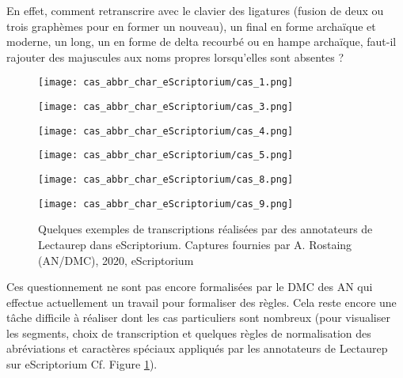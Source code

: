 En effet, comment retranscrire avec le clavier des ligatures (fusion de deux ou trois graphèmes pour en former un nouveau), un  final en forme archaïque et moderne, un  long, un  en forme de delta recourbé ou en hampe archaïque, faut-il rajouter des majuscules aux noms propres lorsqu'elles sont absentes ? 
\newpage
\begin{figure}[H]
    \begin{minipage}[c]{.46\linewidth} 
        \centering
        \texttt{[image: cas\_abbr\_char\_eScriptorium/cas\_1.png]}
        \end{minipage}
    \hfill%
    \begin{minipage}[c]{.46\linewidth}
        \centering
        \texttt{[image: cas\_abbr\_char\_eScriptorium/cas\_3.png]}
    \end{minipage}
    \hfill%
    \begin{minipage}[c]{.46\linewidth}
        \centering
        \texttt{[image: cas\_abbr\_char\_eScriptorium/cas\_4.png]}
    \end{minipage}
    \hfill%
    \begin{minipage}[c]{.46\linewidth}
        \centering
        \texttt{[image: cas\_abbr\_char\_eScriptorium/cas\_5.png]}
    \end{minipage}
    \hfill%
    \begin{minipage}[c]{.46\linewidth}
        \centering
        \texttt{[image: cas\_abbr\_char\_eScriptorium/cas\_8.png]}
    \end{minipage}
    \hfill%
    \begin{minipage}[c]{.46\linewidth}
        \centering
        \texttt{[image: cas\_abbr\_char\_eScriptorium/cas\_9.png]}
    \end{minipage}
        \caption{Quelques exemples de transcriptions réalisées par des annotateurs de Lectaurep dans eScriptorium. \textcopyright Captures fournies par A. Rostaing (AN/DMC), 2020, eScriptorium}
    \label{fig:exemples_eScriptorium}
\end{figure}
\newpage
Ces questionnement ne sont pas encore formalisées par le DMC des AN qui effectue actuellement un travail pour formaliser des règles. Cela reste encore une tâche difficile à réaliser dont les cas particuliers sont nombreux (pour visualiser les segments, choix de transcription et quelques règles de normalisation des abréviations et caractères spéciaux appliqués par les annotateurs de Lectaurep sur eScriptorium Cf. Figure \ref{fig:exemples_eScriptorium}).\\

